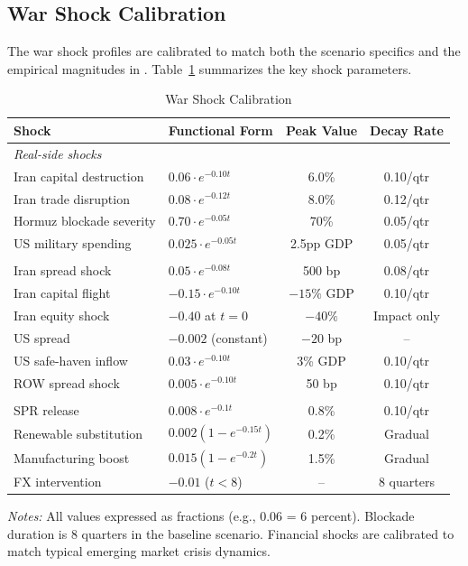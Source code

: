 \documentclass[12pt,a4paper]{article}
\begin{document}
\subsection{War Shock Calibration}

The war shock profiles are calibrated to match both the scenario specifics and the empirical magnitudes in \citet{federle2026price}. Table~\ref{tab:shocks} summarizes the key shock parameters.

\begin{table}[H]
\centering
\small
\begin{threeparttable}
\caption{War Shock Calibration}
\label{tab:shocks}
\begin{tabular}{@{}llcc@{}}
\toprule
Shock & Functional Form & Peak Value & Decay Rate \\
\midrule
\multicolumn{4}{l}{\textit{Real-side shocks}} \\
Iran capital destruction & $0.06 \cdot e^{-0.10t}$ & 6.0\% & 0.10/qtr \\
Iran trade disruption & $0.08 \cdot e^{-0.12t}$ & 8.0\% & 0.12/qtr \\
Hormuz blockade severity & $0.70 \cdot e^{-0.05t}$ & 70\% & 0.05/qtr \\
US military spending & $0.025 \cdot e^{-0.05t}$ & 2.5pp GDP & 0.05/qtr \\
\addlinespace
\multicolumn{4}{l}{\textit{Financial shocks}} \\
Iran spread shock & $0.05 \cdot e^{-0.08t}$ & 500 bp & 0.08/qtr \\
Iran capital flight & $-0.15 \cdot e^{-0.10t}$ & $-15\%$ GDP & 0.10/qtr \\
Iran equity shock & $-0.40$ at $t=0$ & $-40\%$ & Impact only \\
US spread & $-0.002$ (constant) & $-20$ bp & -- \\
US safe-haven inflow & $0.03 \cdot e^{-0.10t}$ & 3\% GDP & 0.10/qtr \\
ROW spread shock & $0.005 \cdot e^{-0.10t}$ & 50 bp & 0.10/qtr \\
\addlinespace
\multicolumn{4}{l}{\textit{China stabilization}} \\
SPR release & $0.008 \cdot e^{-0.1t}$ & 0.8\% & 0.10/qtr \\
Renewable substitution & $0.002(1-e^{-0.15t})$ & 0.2\% & Gradual \\
Manufacturing boost & $0.015(1-e^{-0.2t})$ & 1.5\% & Gradual \\
FX intervention & $-0.01$ ($t < 8$) & -- & 8 quarters \\
\bottomrule
\end{tabular}
\begin{tablenotes}[flushleft]
\small
\item \textit{Notes:} All values expressed as fractions (e.g., 0.06 = 6 percent). Blockade duration is 8 quarters in the baseline scenario. Financial shocks are calibrated to match typical emerging market crisis dynamics.
\end{tablenotes}
\end{threeparttable}
\end{table}
\end{document}
